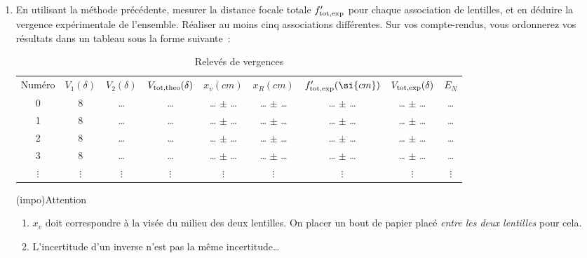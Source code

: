 \documentclass[../main/main.tex]{subfiles}
\begin{document}
\begin{enumerate}[label=\sqenumi, start=4]
	\item En utilisant la méthode précédente, mesurer la distance focale totale
	      $f'_{\rm tot, exp}$ pour chaque association de lentilles, et en déduire
	      la vergence expérimentale de l'ensemble. Réaliser au moins cinq
	      associations différentes. Sur vos compte-rendus, vous ordonnerez vos
	      résultats dans un tableau sous la forme suivante~:
	      \begin{table}[htbp]
		      \centering
		      \caption{Relevés de vergences}
		      \begin{tabular}{ccccccccc}
			      \toprule
			      Numéro   & $V_1 (\delta)$ & $V_2(\delta)$ & $V_{\rm tot, theo}(\delta)$ & $x_v (\si{cm})$ & $x_R (\si{cm})$ & $f'_{\rm tot, exp} (\si{cm})$ & $V_{\rm tot, exp} (\delta)$ & $E_N$
			      \\
			      0        & $8 $           & …             & …                           & … $\pm $ …      & … $\pm $ …      & … $\pm $ …                    & … $\pm $ …                  & …
			      \\
			      1        & $8 $           & …             & …                           & … $\pm $ …      & … $\pm $ …      & … $\pm $ …                    & … $\pm $ …                  & …
			      \\
			      2        & $8 $           & …             & …                           & … $\pm $ …      & … $\pm $ …      & … $\pm $ …                    & … $\pm $ …                  & …
			      \\
			      3        & $8 $           & …             & …                           & … $\pm $ …      & … $\pm $ …      & … $\pm $ …                    & … $\pm $ …                  & …
			      \\
			      $\vdots$ & $\vdots$       & $\vdots$      & $\vdots$                    & $\vdots$        & $\vdots$        & $\vdots$                      & $\vdots$                    & $\vdots$
			      \\
			      \bottomrule
		      \end{tabular}
	      \end{table}

	      \begin{tcb}(impo){Attention}
		      \begin{enumerate}[label=\arabic*)]
			      \item $x_v$ doit correspondre à la visée du milieu des deux
			            lentilles. On placer un bout de papier placé \textit{entre
				            les deux lentilles} pour cela.
			      \item L'incertitude d'un inverse n'est pas la même incertitude…
		      \end{enumerate}
	      \end{tcb}
\end{enumerate}
\end{document}
